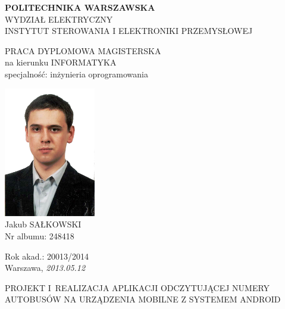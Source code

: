 \begin{titlepage}
    \begin{center}
        \fontsize{14pt}{12px}\selectfont
        \textbf{POLITECHNIKA WARSZAWSKA} \\
        WYDZIAŁ ELEKTRYCZNY \\
        INSTYTUT STEROWANIA I ELEKTRONIKI PRZEMYSŁOWEJ

        \vspace*{.6\baselineskip}

        \fontsize{12pt}{10pt}\selectfont
        PRACA DYPLOMOWA MAGISTERSKA \\
        na kierunku INFORMATYKA \\
        specjalność: inżynieria oprogramowania
    \end{center}

    \begin{flushleft}
        \includegraphics[width=4cm]{img/zdjecie_dyplo.png} \\
        \fontsize{14pt}{12px}\selectfont
        Jakub SAŁKOWSKI \\
        \fontsize{12pt}{10pt}\selectfont
        Nr albumu: 248418
    \end{flushleft}

    \begin{flushright}
        \begin{minipage}{0.3\textwidth}
            \fontsize{12pt}{10pt}\selectfont
            Rok akad.: 20013/2014 \\		
            \fontsize{10pt}{8pt}\selectfont
            Warszawa, \textit{2013.05.12}
        \end{minipage}
    \end{flushright}

    \vspace*{1\baselineskip}

    \begin{center}
        \fontsize{14pt}{12pt}\selectfont
        PROJEKT I~REALIZACJA APLIKACJI ODCZYTUJĄCEJ NUMERY
        AUTOBUSÓW NA URZĄDZENIA MOBILNE Z SYSTEMEM ANDROID
    \end{center}


\end{titlepage}
